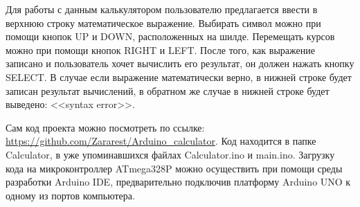 \documentclass[a4paper, 12pt]{article}%
\begin{document}
Для работы с данным калькулятором пользователю предлагается ввести в верхнюю строку математическое выражение. Выбирать символ можно при помощи кнопок UP и DOWN, расположенных на шилде. Перемещать курсов можно при помощи кнопок RIGHT и LEFT. После того, как выражение записано и пользователь хочет вычислить его результат, он должен нажать кнопку SELECT. В случае если выражение математически верно, в нижней строке будет записан результат вычислений, в обратном же случае в нижней строке будет выведено: <<syntax error>>.

Сам код проекта можно посмотреть по ссылке: \url{https://github.com/Zararest/Arduino_calculator}. Код находится в папке Calculator, в уже упоминавшихся файлах Calculator.ino и main.ino. Загрузку кода на микроконтроллер ATmega328P можно осуществить при помощи среды разработки Arduino IDE, предварительно подключив платформу Arduino UNO к одному из портов компьютера.
\end{document}
